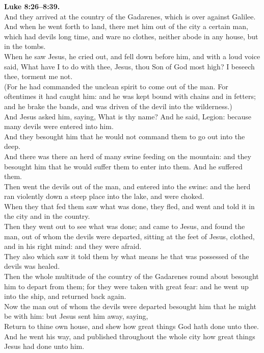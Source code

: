 \documentclass[10pt]{article} %
\begin{document}
{\begin{minipage}[t]{0.51\textwidth}
\textbf{Luke 8:26--8:39.}\\
And they arrived at the country of the Gadarenes, which is over against Galilee.\\
And when he went forth to land, there met him out of the city a certain man, which had devils long time, and ware no clothes, neither abode in any house, but in the tombs.\\
When he saw Jesus, he cried out, and fell down before him, and with a loud voice said, What have I to do with thee, Jesus, thou Son of God most high? I beseech thee, torment me not.\\
(For he had commanded the unclean spirit to come out of the man. For oftentimes it had caught him: and he was kept bound with chains and in fetters; and he brake the bands, and was driven of the devil into the wilderness.)\\
And Jesus asked him, saying, What is thy name? And he said, Legion: because many devils were entered into him.\\
And they besought him that he would not command them to go out into the deep.\\
And there was there an herd of many swine feeding on the mountain: and they besought him that he would suffer them to enter into them. And he suffered them.\\
Then went the devils out of the man, and entered into the swine: and the herd ran violently down a steep place into the lake, and were choked.\\
When they that fed them saw what was done, they fled, and went and told it in the city and in the country.\\
Then they went out to see what was done; and came to Jesus, and found the man, out of whom the devils were departed, sitting at the feet of Jesus, clothed, and in his right mind: and they were afraid.\\
They also which saw it told them by what means he that was possessed of the devils was healed.\\
Then the whole multitude of the country of the Gadarenes round about besought him to depart from them; for they were taken with great fear: and he went up into the ship, and returned back again.\\
Now the man out of whom the devils were departed besought him that he might be with him: but Jesus sent him away, saying,\\
Return to thine own house, and shew how great things God hath done unto thee. And he went his way, and published throughout the whole city how great things Jesus had done unto him.
\end{minipage}}
\end{document}

